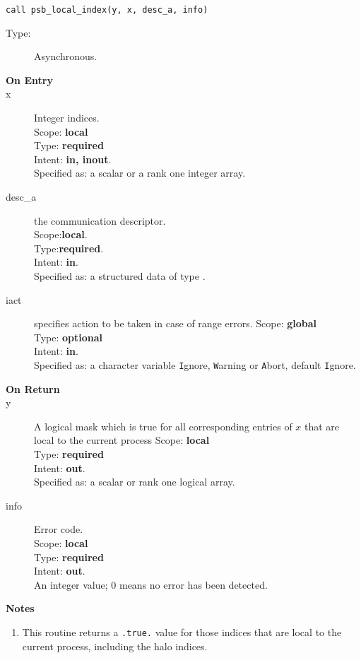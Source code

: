 \begin{verbatim}
call psb_local_index(y, x, desc_a, info)
\end{verbatim}

\begin{description}
\item[Type:] Asynchronous.
\item[\bf On Entry]
\item[x] Integer indices.\\
Scope: {\bf local} \\
Type: {\bf required}\\
Intent: {\bf in, inout}.\\
Specified as: a scalar or a rank one integer array.\\
\item[desc\_a] the communication descriptor.\\
Scope:{\bf local}.\\
Type:{\bf required}.\\
Intent: {\bf in}.\\
Specified as: a structured data of type \descdata.
\item[iact] specifies action to be taken in case of range errors. 
Scope: {\bf global} \\
Type: {\bf optional}\\
Intent: {\bf in}.\\
Specified as: a character variable  \verb|I|gnore, \verb|W|arning or
\verb|A|bort, default \verb|I|gnore.
\end{description}

\begin{description}
\item[\bf On Return]
\item[y] A logical mask which is true for all corresponding entries of
  $x$ that are local to  the current process
Scope: {\bf local} \\
Type: {\bf required}\\
Intent: {\bf out}.\\
Specified as: a scalar or rank one logical array.
\item[info] Error code.\\
Scope: {\bf local} \\
Type: {\bf required} \\
Intent: {\bf out}.\\
An integer value; 0 means no error has been detected. 
\end{description}


{\par\noindent\large\bfseries Notes}
\begin{enumerate}
\item This routine returns a \verb|.true.| value for those indices
  that are local to  the current process, including the halo
  indices.
\end{enumerate}



